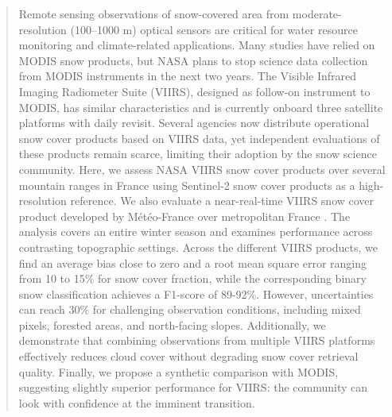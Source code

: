 \documentclass[tc, manuscript]{copernicus}
\begin{document}
\begin{abstract}
Remote sensing observations of snow-covered area from moderate-resolution (100–1000 m) optical sensors are critical for water resource monitoring and climate-related applications. Many studies have relied on MODIS snow products, but NASA plans to stop science data collection from MODIS instruments in the next two years. The Visible Infrared Imaging Radiometer Suite (VIIRS), designed as follow-on instrument to MODIS, has similar characteristics and is currently onboard three satellite platforms with daily revisit. Several agencies now distribute operational snow cover products based on VIIRS data, yet independent evaluations of these products remain scarce, limiting their adoption by the snow science community. Here, we assess NASA VIIRS snow cover products over several mountain ranges in France using Sentinel-2 snow cover products as a high-resolution reference. We also evaluate a near-real-time VIIRS snow cover product developed by Météo-France over metropolitan France . The analysis covers an entire winter season and examines performance across contrasting topographic settings. Across the different VIIRS products, we find an average bias close to zero and a root mean square error ranging from 10 to 15\% for snow cover fraction, while the corresponding binary snow classification achieves a F1-score of 89-92\%. However, uncertainties can reach 30\% for challenging observation conditions, including mixed pixels, forested areas, and north-facing slopes. Additionally, we demonstrate that combining observations from multiple VIIRS platforms effectively reduces cloud cover without degrading snow cover retrieval quality. Finally, we propose a synthetic comparison with MODIS, suggesting slightly superior performance for VIIRS: the community can look with confidence at the imminent transition.

 
\end{abstract}




\introduction  %
\end{document}
